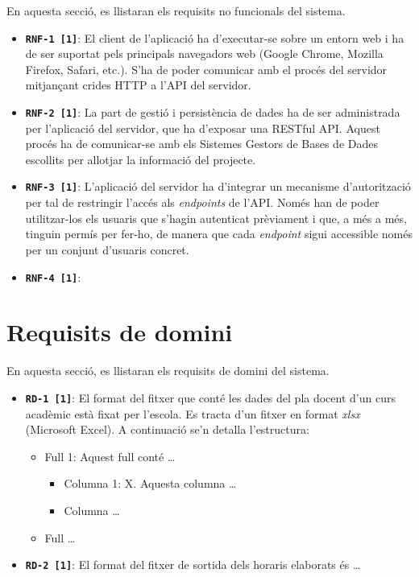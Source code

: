 \documentclass[a4paper,12pt]{ThesisStyle}
\begin{document}
En aquesta secció, es llistaran els requisits no funcionals del sistema.

\begin{itemize}
  \item \texttt{\textbf{RNF-1 [1]}}: El client de l'aplicació ha d'executar-se sobre un entorn web i ha de ser suportat pels principals navegadors web (Google Chrome, Mozilla Firefox, Safari, etc.). S'ha de poder comunicar amb el procés del servidor mitjançant crides HTTP a l'API del servidor.
  \item \texttt{\textbf{RNF-2 [1]}}: La part de gestió i persistència de dades ha de ser administrada per l'aplicació del servidor, que ha d'exposar una RESTful API. Aquest procés ha de comunicar-se amb els Sistemes Gestors de Bases de Dades escollits per allotjar la informació del projecte.
  \item \texttt{\textbf{RNF-3 [1]}}: L'aplicació del servidor ha d'integrar un mecanisme d'autorització per tal de restringir l'accés als \textit{endpoints} de l'API. Només han de poder utilitzar-los els usuaris que s'hagin autenticat prèviament i que, a més a més, tinguin permís per fer-ho, de manera que cada \textit{endpoint} sigui accessible només per un conjunt d'usuaris concret.
  \item \texttt{\textbf{RNF-4 [1]}}: 
\end{itemize}


\section{Requisits de domini}
\label{sec:requisits_domini}

En aquesta secció, es llistaran els requisits de domini del sistema.

\begin{itemize}
  \item \texttt{\textbf{RD-1 [1]}}: El format del fitxer que conté les dades del pla docent d'un curs acadèmic està fixat per l'escola. Es tracta d'un fitxer en format \emph{xlsx} (Microsoft Excel). A continuació se'n detalla l'estructura:
    \begin{itemize}
      \item Full 1: Aquest full conté \ldots
        \begin{itemize}
          \item Columna 1: X. Aquesta columna \ldots
          \item Columna \ldots
        \end{itemize}
      \item Full \ldots
    \end{itemize}
  \item \texttt{\textbf{RD-2 [1]}}: El format del fitxer de sortida dels horaris elaborats és \ldots
\end{itemize}
\end{document}
